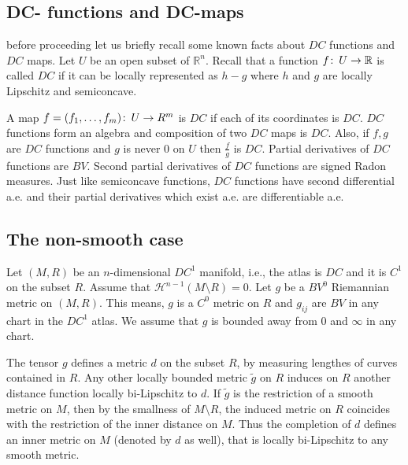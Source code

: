 \documentclass[12pt,leqno]{amsart}
\numberwithin{equation}{section}
\theoremstyle{definition}
\theoremstyle{remark}
\newcommand{\R}{\mathbb{R}}
\def\co{\colon\thinspace}
\begin{document}
\subsection{DC- functions and DC-maps}
before proceeding let us briefly recall some known facts about $DC$ functions and $DC$ maps.
Let $U$ be an open subset of $\R^n$.
Recall that a function $f\co U\to \R$ is called $DC$ if it can be locally represented as  $h-g$ where $h$ and $g$ are locally Lipschitz and semiconcave.


A map $f=(f_1,\ldots, f_m)\co U\to R^m$ is $DC$ if each of its coordinates is $DC$.
 $DC$ functions form an algebra and composition of two $DC$ maps is $DC$. Also, if $f,g$ are $DC$ functions and $g$ is never $0$ on $U$ then $\frac f g$ is $DC$.
Partial derivatives of $DC$ functions are $BV$. Second partial derivatives of $DC$ functions are signed Radon measures. Just like semiconcave functions, $DC$ functions have second differential  a.e. and their partial derivatives which exist a.e. are differentiable a.e.



\subsection{The non-smooth case}
Let $(M,R)$ be an $n$-dimensional  $DC^1$ manifold, i.e., the atlas is $DC$ and it is
$C^1$ on the subset $R$.  Assume that $\mathcal H^{n-1} (M\setminus R) =0$.  Let $g$ be a $BV^0$
Riemannian metric on $(M,R)$. This means, $g$ is a $C^0$ metric on $R$ and $g_{ij}$ are $BV$ in any chart in the $DC^1$ atlas.  We assume that $g$ is bounded  away from $0$ and $\infty$ in any chart.

 The tensor $g$ defines a metric $d$ on the subset $R$, by measuring lengthes of curves contained in $R$.
Any other locally bounded metric $\tilde g$ on $R$ induces on $R$ another distance function locally bi-Lipschitz to $d$.
  If $\tilde g$ is the restriction of a smooth metric on $M$, then by the smallness of $M\setminus R$,
  the induced metric on $R$ coincides with the restriction of the inner distance on $M$.
   Thus  the completion of $d$   defines an inner  metric on $M$
  (denoted by $d$ as well), that is locally bi-Lipschitz to any smooth metric.
\end{document}
